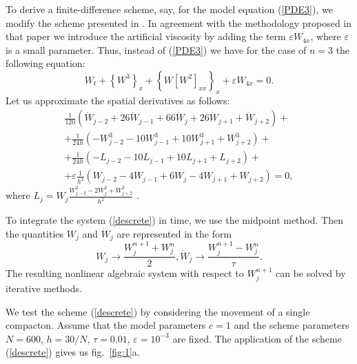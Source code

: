 \documentclass[12pt]{article}
\begin{document}
To derive a finite-difference scheme, say, for the model equation (\ref{PDE3}), we modify the scheme presented in \cite{frutos}.
In agreement with the methodology proposed in that paper we introduce the artificial viscosity by adding the term $\varepsilon
W_{4x}$, where $\varepsilon$ is a small parameter. Thus, instead of
 (\ref{PDE3}) we have for the case of $n=3$ the following equation:
%
\begin{equation}\label{NestNeq3}
W_t+\left\{W^3\right\}_x+\left\{W\left[W^2\right]_{xx}\right\}_x+\varepsilon
W_{4x}=0.
\end{equation}
Let us approximate the spatial derivatives as follows:
\begin{equation}\label{descrete}
\begin{split}
\frac{1}{120}(\dot W_{j-2}+26\dot W_{j-1}+66\dot W_j+26\dot
W_{j+1}+\dot W_{j+2})+
\\+\frac{1}{24h}(-W_{j-2}^3-10 W_{j-1}^3+10 W_{j+1}^3+W_{j+2}^3)+\\
+\frac{1}{24h}(-L_{j-2}-10 L_{j-1}+10 L_{j+1}+L_{j+2})+ \\
+\varepsilon \frac{1}{h^4}(W_{j-2}-4 W_{j-1}+6W_j
-4W_{j+1}+W_{j+2})=0,
\end{split}
\end{equation}
where $L_j=W_j\frac{W_{j-2}^2-2W_j^2+W_{j+2}^2}{h^2}$ .

To integrate the system (\ref{descrete}) in time, we use the midpoint
method.
Then the quantities $W_j$ and $\dot
W_j$ are represented in the form
$$ W_j\rightarrow \frac{W_j^{n+1}+W_j^{n}}{2}, \dot W_j\rightarrow
\frac{W_j^{n+1}-W_j^{n}}{\tau}.$$ The resulting nonlinear
algebraic system with respect to  $W_j^{n+1}$ can be solved by
iterative methods.



We test the scheme (\ref{descrete}) by considering the movement of a
single compacton.  Assume that  the model parameters $c=1$
 and the scheme parameters $N=600$, $h=30/N$, $\tau=0.01$,
$\varepsilon=10^{-3}$ are fixed. The application of the scheme
(\ref{descrete}) gives us fig.\ \ref{fig:1}a.
\end{document}
